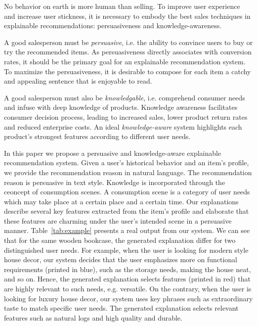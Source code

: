 \documentclass[sigconf]{acmart}
\begin{document}
No behavior on earth is more human than selling. 
To improve user experience and increase user stickness, it is necessary to embody the best sales techniques in explainable recommendations: persuasiveness and knowledge-awareness.

A good salesperson must be \textit{persuasive}, i.e. the ability to convince users to buy or try the recommended items. 
As persuasiveness directly associates with conversion rates, it should be the primary goal for an explainable recommendation system. 
To maximize the persuasiveness, it is desirable to compose for each item a catchy and appealing sentence that is enjoyable to read.

A good salesperson must also be \textit{knowledgable}, i.e. comprehend consumer needs and infuse with deep knowledge of products.
Knowledge awareness facilitates consumer decision process, leading to increased sales, lower product return rates and reduced enterprise costs.
An ideal \textit{knowledge-aware} system highlights each product's strongest features according to different user needs. 

In this paper we propose a persuasive and knowledge-aware explainable recommendation system. Given a user's historical behavior and an item's profile, we provide the recommendation reason in natural language. 
The recommendation reason is persuasive in text style.
Knowledge is incorporated through the ceoncept of consumption scenes.  
A consumption scene is a category of user needs which may take place at a certain place and a certain time.
Our explanations describe several key features extracted from the item's profile and elaborate that these features are charming under the user's intended scene in a persuasive manner.
Table~\ref{tab:example} presents a real output from our system. We can see that for the same wooden bookcase, the generated explanation differ for two distinguished user needs. 
For example, when the user is looking for modern style house decor, our system decides that the user emphasizes more on functional requirements (printed in blue), such as the storage needs, making the house neat, and so on. 
Hence, the generated explanation selects features (printed in red) that are highly relevant to such needs, e.g. versatile.
On the contrary, when the user is looking for luxury house decor, our system uses key phrases such as extraordinary taste to match specific user needs.
The generated explanation selects relevant features such as natural logs and high quality and durable.  
\end{document}
